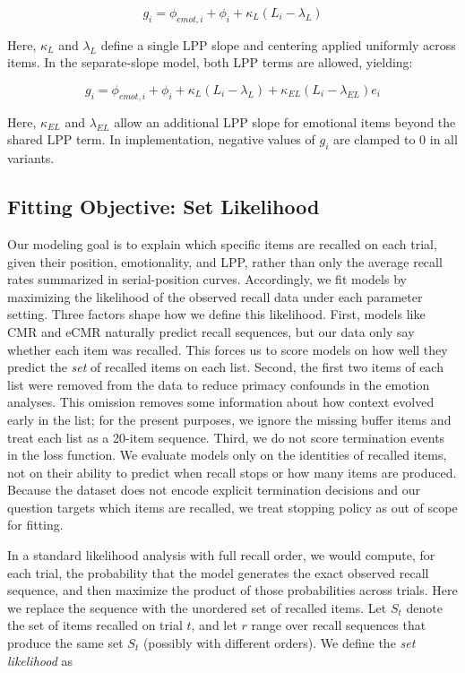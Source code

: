 \documentclass[
  letterpaper,
  DIV=11,
  numbers=noendperiod]{scrartcl}
\begin{document}
\[
g_i = \phi_{emot,i} + \phi_i + \kappa_L (L_i - \lambda_L)
\]

Here, \(\kappa_L\) and \(\lambda_L\) define a single LPP slope and
centering applied uniformly across items. In the separate-slope model,
both LPP terms are allowed, yielding:

\[
g_i = \phi_{emot,i} + \phi_i + \kappa_L (L_i - \lambda_L) + \kappa_{EL} (L_i - \lambda_{EL}) e_i
\]

Here, \(\kappa_{EL}\) and \(\lambda_{EL}\) allow an additional LPP slope
for emotional items beyond the shared LPP term. In implementation,
negative values of \(g_i\) are clamped to 0 in all variants.

\subsection{Fitting Objective: Set
Likelihood}\label{fitting-objective-set-likelihood}

Our modeling goal is to explain which specific items are recalled on
each trial, given their position, emotionality, and LPP, rather than
only the average recall rates summarized in serial-position curves.
Accordingly, we fit models by maximizing the likelihood of the observed
recall data under each parameter setting. Three factors shape how we
define this likelihood. First, models like CMR and eCMR naturally
predict recall sequences, but our data only say whether each item was
recalled. This forces us to score models on how well they predict the
\emph{set} of recalled items on each list. Second, the first two items
of each list were removed from the data to reduce primacy confounds in
the emotion analyses. This omission removes some information about how
context evolved early in the list; for the present purposes, we ignore
the missing buffer items and treat each list as a 20-item sequence.
Third, we do not score termination events in the loss function. We
evaluate models only on the identities of recalled items, not on their
ability to predict when recall stops or how many items are produced.
Because the dataset does not encode explicit termination decisions and
our question targets which items are recalled, we treat stopping policy
as out of scope for fitting.

In a standard likelihood analysis with full recall order, we would
compute, for each trial, the probability that the model generates the
exact observed recall sequence, and then maximize the product of those
probabilities across trials. Here we replace the sequence with the
unordered set of recalled items. Let \(S_t\) denote the set of items
recalled on trial \(t\), and let \(r\) range over recall sequences that
produce the same set \(S_t\) (possibly with different orders). We define
the \emph{set likelihood} as
\end{document}
